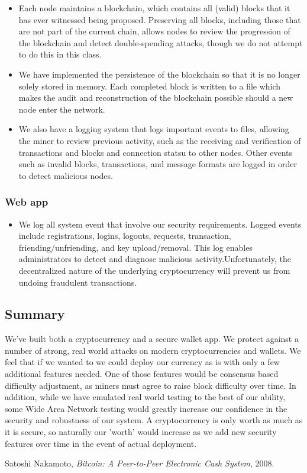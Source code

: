 \documentclass[12pt]{article}
\begin{document}
\begin{itemize}
	\item Each node maintains a blockchain, which contains all (valid) blocks that it has ever witnessed being proposed.
	Preserving all blocks, including those that are not part of the current chain, allows nodes to review the progression of the blockchain and detect double-spending attacks, though we do not attempt to do this in this class.
	\item We have implemented the persistence of the blockchain so that it is no longer solely stored in memory.
	Each completed block is written to a file which makes the audit and reconstruction of the blockchain possible should a new node enter the network.
      \item We also have a logging system that logs important events to files, allowing the miner to review previous activity, such as the receiving and verification of transactions and blocks and connection statsu to other nodes.
        Other events such as invalid blocks, transactions, and message formats are logged in order to detect malicious nodes.

\end{itemize}

\subsubsection*{Web app}

\begin{itemize}
	\item We log all system event that involve our security requirements.
  Logged events include registrations, logins, logouts, requests, transaction, friending/unfriending, and key upload/removal.
  This log enables administrators to detect and diagnose malicious activity.Unfortunately, the decentralized nature of the underlying cryptocurrency will prevent us from undoing fraudulent transactions.
\end{itemize}

\subsection{Summary}

We've built both a cryptocurrency and a secure wallet app. We protect against a number of strong, real world attacks on modern cryptocurrencies and wallets. We feel that if we wanted to we could deploy our currency as is with only a few additional features needed. One of those features would be consensus based difficulty adjustment, as miners must agree to raise block difficulty over time. In addition, while we have emulated real world testing to the best of our ability, some Wide Area Network testing would greatly increase our confidence in the security and robustness of our system. A cryptocurrency is only worth as much as it is secure, so naturally our 'worth' would increase as we add new security features over time in the event of actual deployment.


\begin{thebibliography}{9}
	Satoshi Nakamoto,
	\emph{Bitcoin: A Peer-to-Peer Electronic Cash System},
	2008.
\end{thebibliography}
\end{document}

